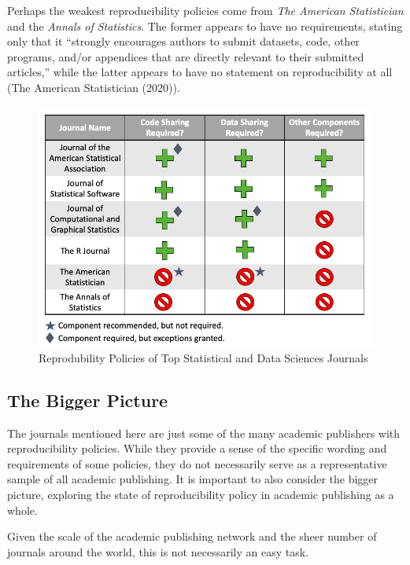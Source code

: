 \documentclass[12pt,twoside]{reedthesis}
\begin{document}
Perhaps the weakest reproducibility policies come from \emph{The
American Statistician} and the \emph{Annals of Statistics}. The former
appears to have no requirements, stating only that it ``strongly
encourages authors to submit datasets, code, other programs, and/or
appendices that are directly relevant to their submitted articles,''
while the latter appears to have no statement on reproducibility at all
(The American Statistician (2020)).
\begin{figure}

{\centering \includegraphics[width=1\linewidth]{figure/stats-journals} 

}

\caption{Reprodubility Policies of Top Statistical and Data Sciences Journals}\label{fig:unnamed-chunk-4}
\end{figure}
\subsection{The Bigger Picture}\label{the-bigger-picture}

The journals mentioned here are just some of the many academic
publishers with reproducibility policies. While they provide a sense of
the specific wording and requirements of some policies, they do not
necessarily serve as a representative sample of all academic publishing.
It is important to also consider the bigger picture, exploring the state
of reproducibility policy in academic publishing as a whole.

Given the scale of the academic publishing network and the sheer number
of journals around the world, this is not necessarily an easy task.
\end{document}
